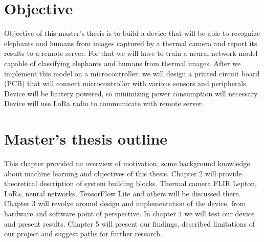 \section{ Objective}

Objective of this master's thesis is to build a device that will be able to recognize elephants and humans from images captured by a thermal camera and report its results to a remote server.
For that we will have to train a neural network model capable of classifying elephants and humans from thermal images.
After we implement this model on a microcontroller, we will design a printed circuit board (PCB) that will connect microcontroller with various sensors and peripherals.
Device will be battery powered, so minimizing power consumption will necessary.
Device will use LoRa radio to communicate with remote server.

\section{ Master's thesis outline}
This chapter provided an overview of motivation, some background knowledge about machine learning and objectives of this thesis.
Chapter 2 will provide theoretical description of system building blocks. Thermal camera FLIR Lepton, LoRa, neural networks, TensorFlow Lite and others will be discussed there.
Chapter 3 will revolve around design and implementation of the device, from hardware and software point of perspective.
In chapter 4 we will test our device and present results.
Chapter 5 will present our findings, described limitations of our project and suggest paths for further research.

